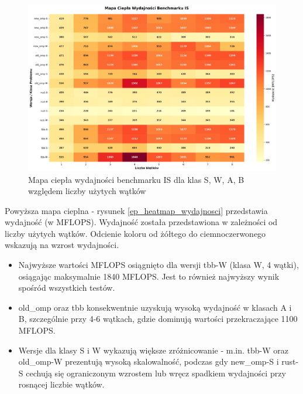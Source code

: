 \begin{figure}[H]
    \centering
    \includegraphics[width=\textwidth]{analiza/images/parallel/is/is_mapa_ciepla_wydajnosci.png}
    \caption{Mapa ciepła wydajności benchmarku IS dla klas S, W, A, B względem liczby użytych wątków}
    \label{is_heatmap_wydajnosci}
\end{figure}
Powyższa mapa cieplna - rysunek \ref{ep_heatmap_wydajnosci} przedstawia wydajność (w MFLOPS). Wydajność została przedstawiona w zależności od liczby użytych wątków. Odcienie koloru od żółtego do ciemnoczerwonego wskazują na wzrost wydajności.
\begin{itemize}
    \item Najwyższe wartości MFLOPS osiągnięto dla wersji tbb-W (klasa W, 4 wątki), osiągając maksymalnie 1840 MFLOPS. Jest to również najwyższy wynik spośród wszystkich testów.
    \item old\_omp oraz tbb konsekwentnie uzyskują wysoką wydajność w klasach A i B, szczególnie przy 4-6 wątkach, gdzie dominują wartości przekraczające 1100 MFLOPS.
    \item Wersje dla klasy S i W wykazują większe zróżnicowanie - m.in. tbb-W oraz old\_omp-W prezentują wysoką skalowalność, podczas gdy new\_omp-S i rust-S cechują się ograniczonym wzrostem lub wręcz spadkiem wydajności przy rosnącej liczbie wątków.
\end{itemize}


